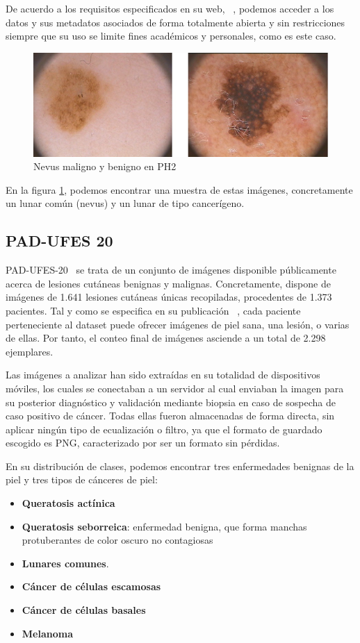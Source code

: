 De acuerdo a los requisitos especificados en su web, ~\cite{ph2data}, podemos acceder a los datos  y sus metadatos asociados de forma totalmente abierta y sin restricciones siempre que su uso se limite fines académicos y personales, como es este caso.
\begin{figure}[H]
	\centering
	\includegraphics[scale = 0.6]{imagenes/PH2.png}
	\caption{Nevus maligno y benigno en PH2}
	\label {ph2}
\end{figure}

En la figura \ref{ph2}, podemos encontrar una muestra de estas imágenes, concretamente un lunar común (nevus) y un lunar de tipo cancerígeno.

\subsection{PAD-UFES 20}
PAD-UFES-20~\cite{PACHECO2020106221} se trata de un conjunto de imágenes disponible públicamente acerca de lesiones cutáneas benignas y malignas. Concretamente, dispone de imágenes de 1.641 lesiones cutáneas únicas recopiladas, procedentes de 1.373 pacientes. Tal y como se especifica en su publicación ~\cite{PACHECO2020106221}, cada paciente perteneciente al dataset puede ofrecer imágenes de piel sana, una lesión, o varias de ellas. Por tanto, el conteo final de imágenes asciende a un total de 2.298 ejemplares.

Las imágenes a analizar han sido extraídas en su totalidad de dispositivos móviles, los cuales se conectaban a un servidor al cual enviaban la imagen para su posterior diagnóstico y validación mediante biopsia en caso de sospecha de caso positivo de cáncer. Todas ellas fueron almacenadas de forma directa, sin aplicar ningún tipo de ecualización o filtro, ya que el formato de guardado escogido es PNG, caracterizado por ser un formato sin pérdidas.

En su distribución de clases, podemos encontrar tres enfermedades benignas de la piel y tres tipos de cánceres de piel:

\begin{itemize}
	\item \textbf{Queratosis actínica}
	\item \textbf{Queratosis seborreica}: enfermedad benigna, que forma manchas protuberantes de color oscuro no contagiosas
	\item \textbf{Lunares comunes}.
	\item \textbf{Cáncer de células escamosas}
	\item \textbf{Cáncer de células basales}
	\item \textbf{Melanoma}
	\end{itemize}

